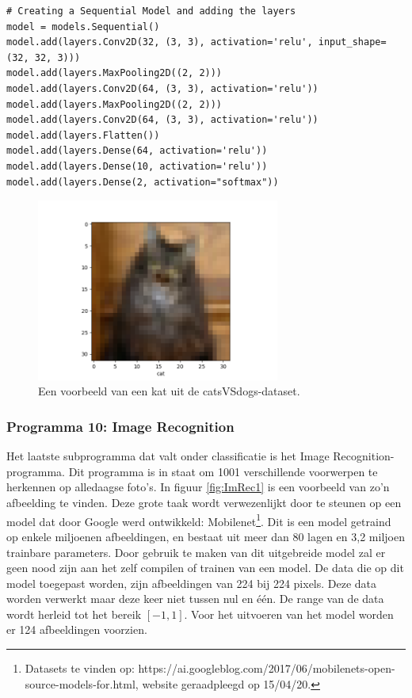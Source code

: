 		
\begin{lstlisting}[caption={Structuur van het Convolutioneel Neuraal Netwerk catsVSdogs.}, captionpos=b,label={lst:catsVSdogsmodel}]
# Creating a Sequential Model and adding the layers
model = models.Sequential()
model.add(layers.Conv2D(32, (3, 3), activation='relu', input_shape=(32, 32, 3)))
model.add(layers.MaxPooling2D((2, 2)))
model.add(layers.Conv2D(64, (3, 3), activation='relu'))
model.add(layers.MaxPooling2D((2, 2)))
model.add(layers.Conv2D(64, (3, 3), activation='relu'))
model.add(layers.Flatten())
model.add(layers.Dense(64, activation='relu'))
model.add(layers.Dense(10, activation='relu'))
model.add(layers.Dense(2, activation="softmax"))
\end{lstlisting}	



		\begin{figure}
			\centering
			\includegraphics[width=80mm]{afbeeldingen/catsVSdogs1.PNG}
			\caption{Een voorbeeld van een kat uit de catsVSdogs-dataset.}
			\label{fig:catsVSdogs1}
		\end{figure}
		
		\newpage
		
		\subsubsection{Programma 10: Image Recognition}
			Het laatste subprogramma dat valt onder classificatie is het Image Recognition-programma. Dit programma is in staat om 1001 verschillende voorwerpen te herkennen op alledaagse foto's. In figuur \ref{fig:ImRec1} is een voorbeeld van zo'n afbeelding te vinden. Deze grote taak wordt verwezenlijkt door te steunen op een model dat door Google werd ontwikkeld: Mobilenet\footnote{Datasets te vinden op: https://ai.googleblog.com/2017/06/mobilenets-open-source-models-for.html, website geraadpleegd op 15/04/20.}. Dit is een model getraind op enkele miljoenen afbeeldingen, en bestaat uit meer dan 80 lagen en 3,2 miljoen trainbare parameters. 
			Door gebruik te maken van dit uitgebreide model zal er geen nood zijn aan het zelf compilen of trainen van een model. De data die op dit model toegepast worden, zijn afbeeldingen van 224 bij 224 pixels. Deze data worden verwerkt maar deze keer niet tussen nul en \'e\'en. De range van de data wordt herleid tot het bereik $[-1, 1]$. Voor het uitvoeren van het model worden er 124 afbeeldingen voorzien. 
		
